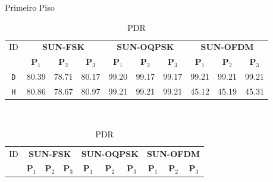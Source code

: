 \begin{table}
      \caption{Primeiro Piso}
      \begin{subtable}{\textwidth}
            \begin{center}
                  \begin{tabular}{|c|c|c|c|c|c|c|c|c|c|}
                        \hline
                        ID         & \multicolumn{3}{c|}{\textbf{SUN-FSK}} & \multicolumn{3}{c|}{\textbf{SUN-OQPSK}} & \multicolumn{3}{c|}{\textbf{SUN-OFDM}}                                                                                                       \\ \cline{2-10}
                                   & \textbf{P$_1$}                        & \textbf{P$_2$}                          & \textbf{P$_3$}                         & \textbf{P$_1$} & \textbf{P$_2$} & \textbf{P$_3$} & \textbf{P$_1$} & \textbf{P$_2$} & \textbf{P$_3$} \\ \hline
                        \texttt{D} & 80.39                                 & 78.71                                   & 80.17                                  & 99.20          & 99.17          & 99.17          & 99.21          & 99.21          & 99.21          \\ \hline
                        \texttt{H} & 80.86                                 & 78.67                                   & 80.97                                  & 99.21          & 99.21          & 99.21          & 45.12          & 45.19          & 45.31          \\ \hline
                  \end{tabular}
                  \caption{PDR}
                  \label{table:pdr1}
            \end{center}
      \end{subtable}%
      \\
      \par\bigskip
      \begin{subtable}{\textwidth}
            \begin{center}
                  \begin{tabular}{|c|c|c|c|c|c|c|c|c|c|}
                        \hline
                        ID         & \multicolumn{3}{c|}{\textbf{SUN-FSK}} & \multicolumn{3}{c|}{\textbf{SUN-OQPSK}} & \multicolumn{3}{c|}{\textbf{SUN-OFDM}}                                                                                                       \\ \cline{2-10}
                                   & \textbf{P$_1$}                        & \textbf{P$_2$}                          & \textbf{P$_3$}                         & \textbf{P$_1$} & \textbf{P$_2$} & \textbf{P$_3$} & \textbf{P$_1$} & \textbf{P$_2$} & \textbf{P$_3$} \\ \hline

\end{tabular}
\end{center}
\end{subtable}
\end{table}
